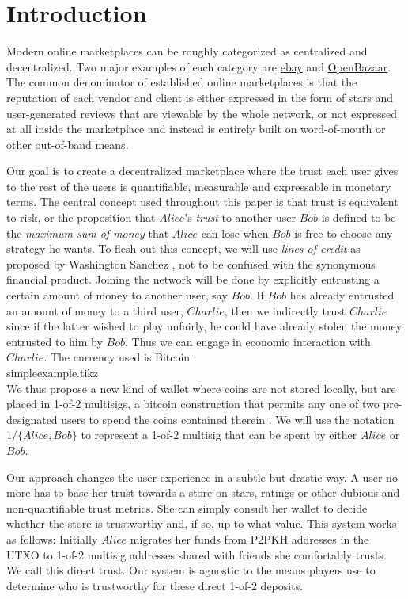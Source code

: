 \section{Introduction}
   Modern online marketplaces can be roughly categorized as centralized and decentralized.
   Two major examples of each category are \href{http://www.ebay.com}{ebay} and \href{https://openbazaar.org/}{OpenBazaar}.
   The common denominator of established online marketplaces is that the reputation of each vendor and client is either
   expressed in the form of stars and user-generated reviews that are viewable by the whole network, or not expressed at
   all inside the marketplace and instead is entirely built on word-of-mouth or other out-of-band means.

   Our goal is to create a decentralized marketplace where the trust each user gives to the rest of the users is
   quantifiable, measurable and expressable in monetary terms. The central concept used throughout this paper is
   that trust is equivalent to risk, or the proposition that $Alice$'s \textit{trust} to another user $Bob$ is defined to
   be the \textit{maximum sum of money} that $Alice$ can lose when $Bob$ is free to choose any strategy he wants. To flesh
   out this concept, we will use \textit{lines of credit} as proposed by Washington Sanchez \cite{loc}, not to be confused
   with the synonymous financial product. Joining the network
   will be done by explicitly entrusting a certain amount of money to another user, say $Bob$. If $Bob$ has already
   entrusted an amount of money to a third user, $Charlie$, then we indirectly trust $Charlie$ since if the latter wished
   to play unfairly, he could have already stolen the money entrusted to him by $Bob$. Thus we can engage in economic
   interaction with $Charlie$. The currency used is Bitcoin \cite{bitcoin}. \medskip \ \\
   {simpleexample.tikz} \smallskip \ \\
   We thus propose a new kind of wallet where coins are not stored locally, but are placed in 1-of-2 multisigs, a bitcoin
   construction that permits any one of two pre-designated users to spend the coins contained therein
   \cite{masteringbitcoin}. We will use the notation 1/$\{Alice, Bob\}$ to represent a 1-of-2 multisig that can be spent by
   either $Alice$ or $Bob$.

   Our approach changes the user experience in a subtle but drastic way. A user no more has to base her trust towards a
   store on stars, ratings or other dubious and non-quantifiable trust metrics. She can simply consult her wallet to
   decide whether the store is trustworthy and, if so, up to what value. This system works as follows: Initially $Alice$
   migrates her funds from P2PKH addresses in the UTXO \cite{masteringbitcoin} to 1-of-2 multisig addresses shared with
   friends she comfortably trusts. We call this direct trust. Our system is agnostic to the means players use to determine
   who is trustworthy for these direct 1-of-2 deposits.

